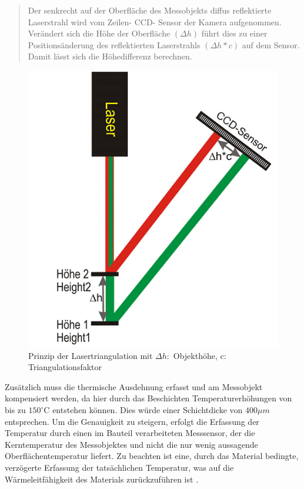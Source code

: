 \begin{quotation}
Der senkrecht auf der Oberfläche des Messobjekts diffus reflektierte Laserstrahl wird vom Zeilen- CCD- Sensor der Kamera aufgenommen. Verändert sich die Höhe der Oberfläche $(\Delta h)$ führt dies zu einer Positionsänderung des reflektierten Laserstrahls $(\Delta h*c)$ auf dem Sensor. Damit lässt sich die Höhedifferenz berechnen. \cite{gindorf}
\end{quotation}

\newpage
\begin{figure}[h]
	\label{fig:lasertriangulation}
	\centering
		\includegraphics[scale=1.5]{bilder/lasertriangulation}
	\caption[Prinzip der Lasertriangulation]{Prinzip der Lasertriangulation mit $\Delta h:$ Objekthöhe, c: Triangulationsfaktor \protect\footnotemark}
\end{figure}

Zusätzlich muss die thermische Ausdehnung erfasst und am Messobjekt kompensiert werden, da hier durch das Beschichten Temperaturerhöhungen von bis zu $150^\circ\text{C}$ entstehen können. Dies würde einer Schichtdicke von $400 \mu m$ entsprechen. Um die Genauigkeit zu steigern, erfolgt die Erfassung der Temperatur durch einen im Bauteil verarbeiteten Messsensor, der die Kerntemperatur des Messobjektes und nicht die nur wenig aussagende Oberflächentemperatur liefert. Zu beachten ist eine, durch das Material bedingte, verzögerte Erfassung der tatsächlichen Temperatur, was auf die Wärmeleitfähigkeit des Materials zurückzuführen ist \cite{gindorf}. 
\\

